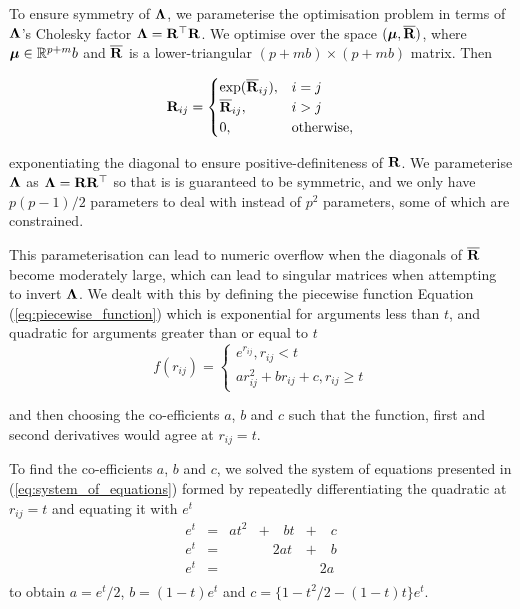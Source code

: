 To ensure symmetry of ${\boldsymbol \Lambda}$, we parameterise the optimisation problem in terms of ${\boldsymbol \Lambda}$'s
Cholesky factor  ${\boldsymbol \Lambda} = {\bf R}^\top {\bf R}$. We optimise over the space $({\boldsymbol \mu}, \overline{{\bf R}})$, where ${\boldsymbol \mu}
\in {\mathbb{R}}^{p + m}b$ and $\overline{{\bf R}}$ is a lower-triangular $(p + mb) \times (p + mb)$ matrix. Then
		
\begin{equation*}
	{\bf R}_{ij} =
	\begin{cases}
		\exp(\overline{{\bf R}}_{ij}), & i = j             \\
		\overline{{\bf R}}_{ij},       & i > j             \\
		0,                         & \text{otherwise}, 
	\end{cases}
\end{equation*}
		
\noindent exponentiating the diagonal to ensure positive-definiteness of ${\bf R}$. We parameterise ${\boldsymbol \Lambda}$
as ${\boldsymbol \Lambda} = {\bf R} {\bf R}^\top$ so that is is guaranteed to be symmetric, and we only have $p(p-1)/2$ 
parameters to deal with instead of $p^2$ parameters, some of which are constrained. 

This parameterisation can lead to numeric overflow when the diagonals of $\overline{{\bf R}}$ become moderately
large, which can lead to singular matrices when attempting to invert ${\boldsymbol \Lambda}$. We dealt with this by
defining the piecewise function Equation (\ref{eq:piecewise_function}) which is exponential for arguments less
than $t$, and quadratic for arguments greater than or equal to $t$
\begin{equation}
\label{eq:piecewise_function}
f(r_{ij}) =
\begin{cases}
	e^{r_{ij}}, r_{ij} < t                   \\
	a r_{ij}^2 + b r_{ij} + c, r_{ij} \geq t 
\end{cases}
\end{equation}

\noindent and then choosing the co-efficients $a$, $b$ and $c$ such that the function, first and second
derivatives would agree at $r_{ij} = t$.

To find the co-efficients $a$, $b$ and $c$, we solved the system of equations presented in
(\ref{eq:system_of_equations}) formed by repeatedly  differentiating the quadratic at $r_{ij} =  t$ and equating
it with $e^t$
\begin{equation}
\label{eq:system_of_equations}
\begin{array}{lllll}
	e^t & = & a t^2 & + \quad b t & + \quad c \\
	e^t & = &       & \quad 2a t  & + \quad b \\
	e^t & = &       &             & \quad 2a  \\
\end{array}
\end{equation}
\noindent to obtain $a = e^t / 2$, $b = (1 - t) e^t$ and $c = \{1 - t^2/2 - (1 - t) t\} e^t$.

